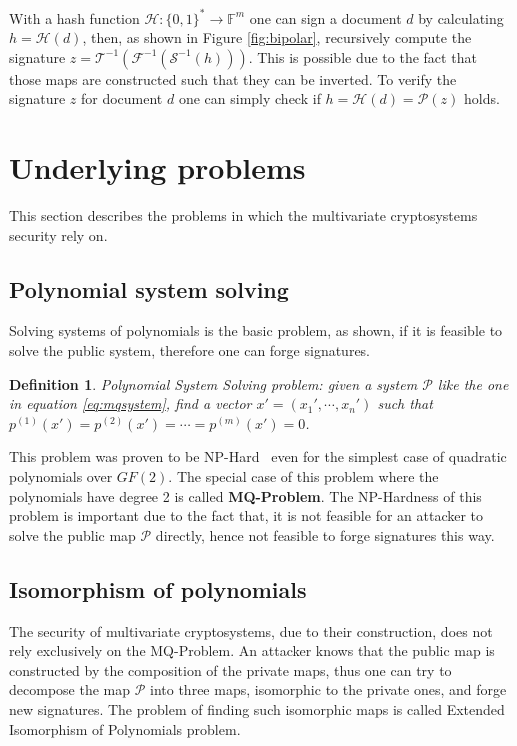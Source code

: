 \documentclass{ufsctex/ufsctex}
\newtheorem{definition}{Definition}
\begin{document}
With a hash function $\mathcal{H}:\{0,1\}^* \to \mathbb{F}^m$ one can sign a
document $d$ by calculating $h = \mathcal{H}(d)$, then, as shown in Figure
\ref{fig:bipolar}, recursively compute the signature $z =
\mathcal{T}^{-1}(\mathcal{F}^{-1}(\mathcal{S}^{-1}(h)))$. This is possible due
to the fact that those maps are constructed such that they can be inverted. To
verify the signature $z$ for document $d$ one can simply check if $h =
\mathcal{H}(d) = \mathcal{P}(z)$ holds.

\section{Underlying problems}\label{sec:problems}

This section describes the problems in which the multivariate cryptosystems
security rely on.

\subsection{Polynomial system solving}

Solving systems of polynomials is the basic problem, as shown, if it is
feasible to solve the public system, therefore one can forge signatures.

\begin{definition}
Polynomial System Solving problem: given a system $\mathcal{P}$ like the one in
equation \ref{eq:mqsystem}, find a vector $x' = (x_1',\cdots,x_n')$ such that
$p^{(1)}(x') = p^{(2)}(x') = \cdots = p^{(m)}(x') = 0$.
\end{definition}

This problem was proven to be NP-Hard~\cite[Appendix A7.2]{garey1990npc} even
for the simplest case of quadratic polynomials over $GF(2)$. The special case
of this problem where the polynomials have degree 2 is called
\textbf{MQ-Problem}. The NP-Hardness of this problem is important due to the
fact that, it is not feasible for an attacker to solve the public map
$\mathcal{P}$ directly, hence not feasible to forge signatures this way.

\subsection{Isomorphism of polynomials}

The security of multivariate cryptosystems, due to their construction, does not
rely exclusively on the MQ-Problem. An attacker knows that the public map is
constructed by the composition of the private maps, thus one can try to
decompose the map $\mathcal{P}$ into three maps, isomorphic to the private
ones, and forge new signatures. The problem of finding such isomorphic maps is
called Extended Isomorphism of Polynomials problem.
\end{document}

